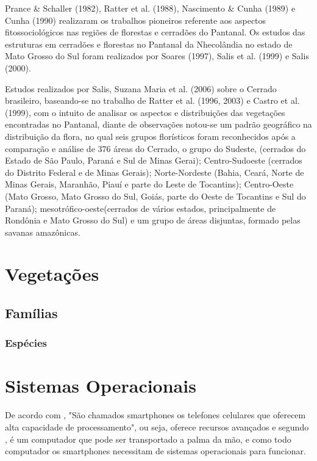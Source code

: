 			Prance \& Schaller (1982), Ratter et al. (1988), Nascimento \& Cunha (1989) e Cunha (1990) realizaram os trabalhos pioneiros referente aos aspectos fitossociológicos nas regiões de florestas e cerradões do Pantanal. Os estudos das estruturas em cerradões e florestas no Pantanal da Nhecolândia no estado de Mato Grosso do Sul foram realizados por Soares (1997), Salis et al. (1999) e Salis (2000).
		
			Estudos realizados por Salis, Suzana Maria et al. (2006) sobre o Cerrado brasileiro, baseando-se no trabalho de Ratter et al. (1996, 2003) e Castro et al. (1999), com o intuito de analisar os aspectos e distribuições das vegetações encontradas no Pantanal, diante de observações notou-se um padrão geográfico na distribuição da flora, no qual seis grupos florísticos foram reconhecidos após a comparação e análise de 376 áreas do Cerrado, o grupo do Sudeste, (cerrados do Estado de São Paulo, Paraná e Sul de Minas Gerai); Centro-Sudoeste (cerrados do Distrito Federal e de Minas Gerais); Norte-Nordeste (Bahia, Ceará, Norte de Minas Gerais, Maranhão, Piauí e parte do Leste de Tocantins); Centro-Oeste (Mato Grosso, Mato Grosso do Sul, Goiás, parte do Oeste de Tocantins e Sul do Paraná); mesotrófico-oeste(cerrados de vários estados, principalmente de Rondônia e Mato Grosso do Sul) e um grupo de áreas disjuntas, formado pelas savanas amazônicas.
		
	
\section{Vegetações }

	\subsection{Famílias}
	
		\subsubsection{Espécies}
		
			
		


\section{Sistemas Operacionais}
		
	De acordo com , "São chamados smartphones os telefones celulares que oferecem alta capacidade de processamento", ou seja, oferece recursos avançados e segundo , é um computador que pode ser transportado a palma da mão, e como todo computador os smartphones necessitam de sistemas operacionais para funcionar.
		
